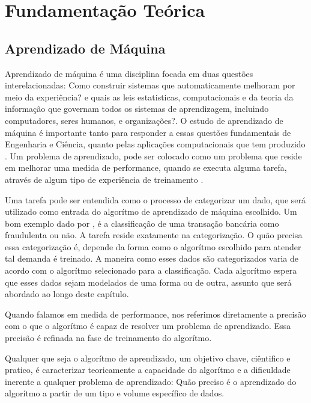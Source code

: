 \chapter{Fundamentação Teórica}

\section{Aprendizado de Máquina}
Aprendizado de máquina é uma disciplina focada em duas questões interelacionadas: Como construir sistemas que automaticamente melhoram por meio da experiência? e quais as leis estatisticas,
computacionais e da teoria da informação que governam todos os sistemas de aprendizagem, incluindo computadores, seres humanos, e organizações?. O estudo de aprendizado de máquina é importante tanto
para responder a essas questões fundamentais de Engenharia e Ciência, quanto pelas aplicações computacionais que tem produzido \cite{Jordan}.
Um problema de aprendizado, pode ser colocado como um problema que reside em melhorar uma medida de performance, quando se executa alguma tarefa, através de algum tipo de experiência de treinamento \cite{Jordan}.

Uma tarefa pode ser entendida como o processo de categorizar um dado, que será utilizado como entrada do algorítmo de aprendizado de máquina escolhido. Um bom exemplo dado por \cite{Jordan}, é a classificação de uma
transação bancária como fraudulenta ou não. A tarefa reside exatamente na categorização. O quão precisa essa categorização é, depende da forma como o algorítmo escolhido para atender tal demanda é treinado. A maneira como
esses dados são categorizados varia de acordo com o algorítmo selecionado para a classificação. Cada algorítmo espera que esses dados sejam modelados de uma forma ou de outra, assunto que será abordado ao longo deste capítulo.

Quando falamos em medida de performance, nos referimos diretamente a precisão com o que o algorítmo é capaz de resolver um problema de aprendizado. Essa precisão é refinada na fase de treinamento do algorítmo.

Qualquer que seja o algorítmo de aprendizado, um objetivo chave, ciêntifico e pratico, é caracterizar teoricamente a capacidade do algorítmo e a dificuldade inerente a qualquer problema de aprendizado: Quão preciso é o aprendizado
do algorítmo a partir de um tipo e volume específico de dados\cite{Jordan}.



